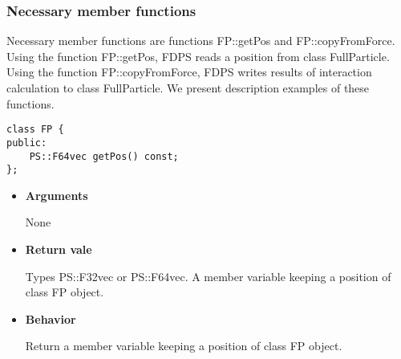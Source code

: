 \subsubsection{Necessary member functions}



Necessary member functions are functions FP::getPos and
FP::copyFromForce. Using the function FP::getPos, FDPS reads a
position from class FullParticle. Using the function
FP::copyFromForce, FDPS writes results of interaction calculation to
class FullParticle. We present description examples of these
functions.


\begin{screen}
\begin{verbatim}
class FP {
public:
    PS::F64vec getPos() const;
};
\end{verbatim}
\end{screen}

\begin{itemize}

\item {\bf Arguments}

  None
  
\item {\bf Return vale}

  Types PS::F32vec or PS::F64vec. A member variable keeping a position
  of class FP object.
  
\item {\bf Behavior}

  Return a member variable keeping a position of class FP object.
  
\end{itemize}


